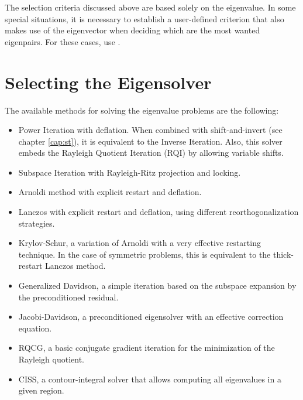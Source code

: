
The selection criteria discussed above are based solely on the eigenvalue. In some special situations, it is necessary to establish a user-defined criterion that also makes use of the eigenvector when deciding which are the most wanted eigenpairs. For these cases, use .

\section{Selecting the Eigensolver}

	The available methods for solving the eigenvalue problems are the following:
\begin{itemize}
\setlength{\itemsep}{0pt}
\item Power Iteration with deflation. When combined with shift-and-invert (see chapter \ref{cap:st}), it is equivalent to the Inverse Iteration. Also, this solver embeds the Rayleigh Quotient Iteration (RQI) by allowing variable shifts.
\item Subspace Iteration with Rayleigh-Ritz projection and locking.
\item Arnoldi method with explicit restart and deflation.
\item Lanczos with explicit restart and deflation, using different reorthogonalization strategies.
\item Krylov-Schur, a variation of Arnoldi with a very effective restarting technique. In the case of symmetric problems, this is equivalent to the thick-restart Lanczos method.
\item Generalized Davidson, a simple iteration based on the subspace expansion by the preconditioned residual.
\item Jacobi-Davidson, a preconditioned eigensolver with an effective correction equation.
\item RQCG, a basic conjugate gradient iteration for the minimization of the Rayleigh quotient.
\item CISS, a contour-integral solver that allows computing all eigenvalues in a given region.
\end{itemize}

